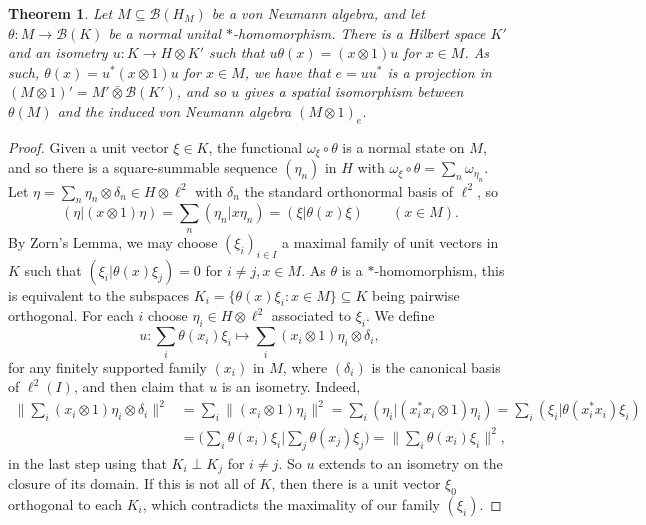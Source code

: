 \documentclass[a4paper,11pt]{article}
\theoremstyle{plain}
\newtheorem{theorem}[proposition]{Theorem}
\theoremstyle{remark}
\newcommand{\mc}[1]{\mathcal{#1}}
\newcommand{\vnten}{\bar\otimes}
\begin{document}
\begin{theorem}
Let $M\subseteq\mc B(H_M)$ be a von Neumann algebra, and let $\theta \colon M \to \mc B(K)$ be a normal unital $*$-homomorphism.  There is a Hilbert space $K'$ and an isometry $u\colon K \to H \otimes K'$ such that $u\theta(x) = (x\otimes 1)u$ for $x\in M$.  As such, $\theta(x) = u^*(x\otimes 1)u$ for $x\in M$, we have that $e = uu^*$ is a projection in $(M\otimes 1)' = M'\vnten\mc B(K')$, and so $u$ gives a spatial isomorphism between $\theta(M)$ and the induced von Neumann algebra $(M\otimes 1)_e$.
\end{theorem}
\begin{proof}
Given a unit vector $\xi\in K$, the functional $\omega_\xi\circ\theta$ is a normal state on $M$, and so there is a square-summable sequence $(\eta_n)$ in $H$ with $\omega_\xi\circ\theta = \sum_n \omega_{\eta_n}$.  Let $\eta = \sum_n \eta_n \otimes \delta_n \in H\otimes \ell^2$ with $\delta_n$ the standard orthonormal basis of $\ell^2$, so
\[ (\eta|(x\otimes 1)\eta) = \sum_n (\eta_n|x\eta_n) = (\xi|\theta(x)\xi) \qquad (x\in M). \]
By Zorn's Lemma, we may choose $(\xi_i)_{i\in I}$ a maximal family of unit vectors in $K$ such that $(\xi_i|\theta(x)\xi_j)=0$ for $i\not=j, x\in M$.  As $\theta$ is a $*$-homomorphism, this is equivalent to the subspaces $K_i = \{ \theta(x)\xi_i : x\in M \}\subseteq K$ being pairwise orthogonal.  For each $i$ choose $\eta_i\in H\otimes\ell^2$ associated to $\xi_i$.
We define
\[ u \colon \sum_i \theta(x_i)\xi_i \mapsto \sum_i (x_i\otimes 1)\eta_i\otimes\delta_i, \]
for any finitely supported family $(x_i)$ in $M$, where $(\delta_i)$ is the canonical basis of $\ell^2(I)$, and then claim that $u$ is an isometry.  Indeed,
\begin{align*}
\Big\| \sum_i (x_i\otimes 1)\eta_i\otimes\delta_i \Big\|^2
&= \sum_i \| (x_i\otimes 1)\eta_i \|^2
= \sum_i (\eta_i|(x_i^*x_i\otimes 1)\eta_i)
= \sum_i (\xi_i|\theta(x_i^*x_i)\xi_i) \\
&= \Big( \sum_i \theta(x_i)\xi_i \Big| \sum_j \theta(x_j)\xi_j \Big)
= \Big\| \sum_i \theta(x_i)\xi_i \Big\|^2,
\end{align*}
in the last step using that $K_i \perp K_j$ for $i\not=j$.  So $u$ extends to an isometry on the closure of its domain.  If this is not all of $K$, then there is a unit vector $\xi_0$ orthogonal to each $K_i$, which contradicts the maximality of our family $(\xi_i)$.


\end{proof}
\end{document}
